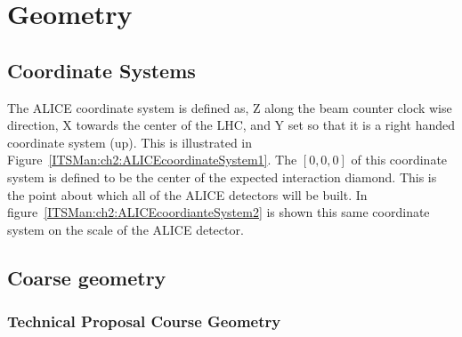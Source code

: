 \chapter{Geometry}

\section{Coordinate Systems}

The ALICE coordinate system is defined as, Z along the beam counter clock wise
direction, X towards the center of the LHC, and Y set so that it is a right
handed coordinate system (up). This is illustrated in
Figure~\ref{ITSMan:ch2:ALICEcoordinateSystem1}. The $[0,0,0]$ of this
coordinate system is defined to be the center of the expected interaction
diamond. This is the point about which all of the ALICE detectors will be 
built. In figure~\ref{ITSMan:ch2:ALICEcoordianteSystem2} is shown this same
coordinate system on the scale of the ALICE detector.

\begin{figure*}[htbp]
  \begin{center}
    \leavevmode
    \caption{Here is the LHC ring. At the sight where ALICE will be located
    (Lep 3) is placed the three axis defining the ALICE coordinate system.}
    \label{ITSMan:ch2:ALICEcoordinateSystem1}
  \end{center}
\end{figure*}

\begin{figure*}[htbp]
  \begin{center}
    \leavevmode
    \caption{Here is shown the ALICE coordinate system with respect to the
    ALICE detectors.}
    \label{ITSMan:ch2:ALICEcoordinateSystem2}
  \end{center}
\end{figure*}

\section{Coarse geometry}

\subsection{Technical Proposal Course Geometry}

